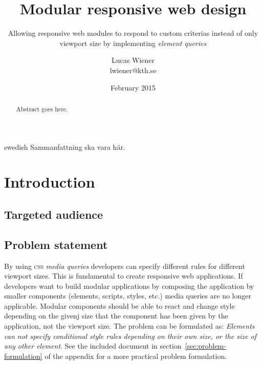 \documentclass[a4paper,11pt]{kth-mag}
\title{Modular responsive web design}
\subtitle{Allowing responsive web modules to respond to custom criterias instead of only viewport size by implementing \emph{element queries}}
\author{Lucas Wiener \\ \lowercase{lwiener@kth.se}}
\date{February 2015}
\begin{document}
  \frontmatter
  \pagestyle{empty}
  \removepagenumbers
  \maketitle
  \begin{abstract}
    Abstract goes here.
  \end{abstract}
  \clearpage
  \begin{foreignabstract}{swedish}
    Sammanfattning ska vara här.
  \end{foreignabstract}
  \clearpage
  \tableofcontents*
  \mainmatter
  \pagestyle{newchap}
  \chapter{Introduction}
    \section{Targeted audience}
    \section{Problem statement}
      By using \textsc{css} \emph{media queries} developers can specify different rules for different viewport sizes.
      This is fundamental to create responsive web applications.
      If developers want to build modular applications by composing the application by smaller components (elements, scripts, styles, etc.) media queries are no longer applicable.
      Modular components should be able to react and change style depending on the givenj size that the component has been given by the application, not the viewport size.
      The problem can be formulated as: \emph{Elements can not specify conditional style rules depending on their own size, or the size of any other element}.
      See the included document in section~\ref{sec:problem-formulation} of the appendix for a more practical problem formulation.
\end{document}
